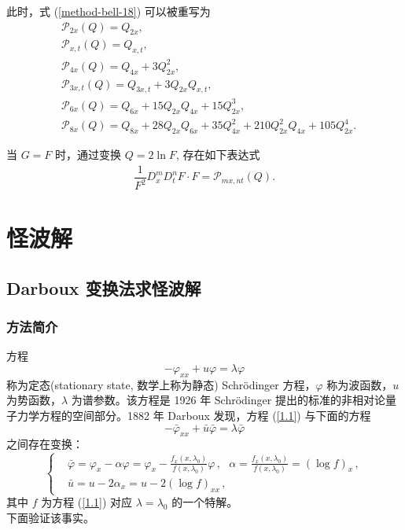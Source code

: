 此时，式 (\ref{method-bell-18}) 可以被重写为
\begin{align}
& \mathcal{P}_{2x}(Q)=Q_{2x}, \label{method-bell-19}\\
& \mathcal{P}_{x,t}(Q)=Q_{x,t},\label{method-bell-20}\\
& \mathcal{P}_{4x}(Q)=Q_{4x}+3 Q_{2x}^2,\label{method-bell-21}\\
& \mathcal{P}_{3x,t}(Q)=Q_{3x,t}+3 Q_{2x}Q_{x,t},\label{method-bell-22}\\
& \mathcal{P}_{6x}(Q)=Q_{6x}+15 Q_{2x} Q_{4x}+15 Q_{2x}^3,\label{method-bell-23}\\
& \mathcal{P}_{8x}(Q)=Q_{8x}+28 Q_{2x} Q_{6x}+35 Q_{4x}^2+210 Q_{2x}^2 Q_{4x}+105 Q_{2x}^4.\label{method-bell-24}
\end{align}

当 $G=F$ 时，通过变换 $Q=2\ln F$, 存在如下表达式
\begin{align}
\dfrac{1}{F^2}D_x^mD_t^nF\cdot F=\mathcal{P}_{mx,nt}(Q).\label{method-bell-25}
\end{align}
\section{怪波解}
\subsection{Darboux 变换法求怪波解}
\subsubsection{方法简介}
方程
\begin{equation}
-\varphi_{xx} + u \varphi = \lambda \varphi \label{1.1}
\end{equation}
称为定态(stationary state, 数学上称为静态) Schr\"{o}dinger 方程，$\varphi$ 称为波函数，$u$ 为势函数，$\lambda$ 为谱参数。该方程是 1926 年 Schr\"{o}dinger
提出的标准的非相对论量子力学方程的空间部分。1882 年 Darboux 发现，方程 (\ref{1.1}) 与下面的方程
\begin{equation}
-\bar{\varphi}_{xx} + \bar{u} \bar{\varphi} = \lambda \bar{\varphi}
\label{1.2}
\end{equation}
之间存在变换：
\begin{equation}
\left\{
\begin{aligned}
&\bar{\varphi}  =  \varphi_x - \alpha \varphi = \varphi_x - \frac{f_x(x, \lambda_0)}{f(x, \lambda_0)} \varphi\,,\ \ \ \alpha = \frac{f_x(x, \lambda_0)}{f(x, \lambda_0)}=(\log f)_{x}\,, \\
&\bar{u}  =  u - 2 \alpha_x = u - 2 (\log f)_{xx}\,,
\end{aligned} \label{1.3}
\right.
\end{equation}
其中 $f$ 为方程 (\ref{1.1}) 对应 $\lambda = \lambda_0$ 的一个特解。\\
下面验证该事实。

